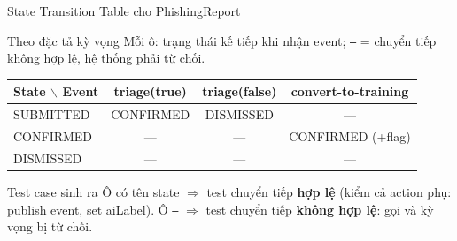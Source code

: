 \documentclass[aspectratio=169,12pt]{beamer}
\begin{document}
\begin{frame}[shrink=6]{State Transition Table cho PhishingReport}
  \begin{block}{Theo đặc tả kỳ vọng}
    Mỗi ô: trạng thái kế tiếp khi nhận event; \texttt{---} = chuyển tiếp
    không hợp lệ, hệ thống phải từ chối.
  \end{block}

  \vspace{0.1em}
  \begin{center}
  \small
  \setlength{\tabcolsep}{6pt}
  \begin{tabular}{lccc}
    \toprule
    \textbf{State} $\backslash$ \textbf{Event}
      & triage(true) & triage(false) & convert-to-training \\
    \midrule
    SUBMITTED & CONFIRMED & DISMISSED & --- \\
    CONFIRMED & ---       & ---       & CONFIRMED (+flag) \\
    DISMISSED & ---       & ---       & --- \\
    \bottomrule
  \end{tabular}
  \end{center}

  \vspace{0.2em}
  \begin{exampleblock}{Test case sinh ra}
    \small Ô có tên state $\Rightarrow$ test chuyển tiếp \textbf{hợp lệ}
    (kiểm cả action phụ: publish event, set aiLabel). Ô \texttt{---}
    $\Rightarrow$ test chuyển tiếp \textbf{không hợp lệ}: gọi và kỳ vọng bị từ chối.
  \end{exampleblock}
\end{frame}
\end{document}

